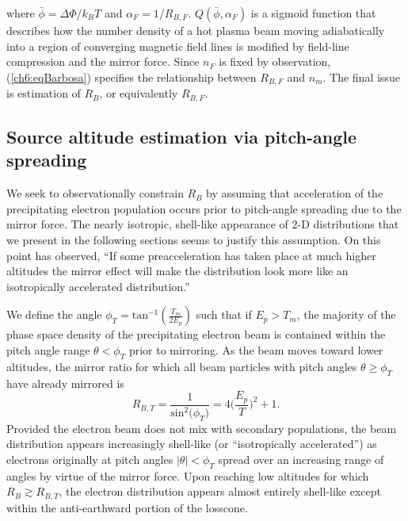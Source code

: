   where $\bar{\phi} = \Delta \Phi / k_B T $ and $\alpha_F = 1 / R_{B,F}$.
  $Q (\bar{\phi}, \alpha_F)$ is a sigmoid function \citep[Figure
  1b][]{Barbosa1977} that describes how the number density of a hot plasma beam
  moving adiabatically into a region of converging magnetic field lines is
  modified by field-line compression and the mirror force. Since $n_F$ is fixed
  by observation, (\ref{ch6:eqBarbosa}) specifies the relationship between
  $R_{B,F}$ and $n_m$. The final issue is estimation of $R_B$, or equivalently
  $R_{B,F}$.

  \subsection{Source altitude estimation via pitch-angle spreading} \label{ssSourceAlt}

  We seek to observationally constrain $R_B$ by assuming that acceleration of
  the precipitating electron population occurs prior to pitch-angle spreading
  due to the mirror force. The nearly isotropic, shell-like appearance of 2-D
  distributions that we present in the following sections seems to justify this
  assumption. On this point \citet{Bostrom2003a} has observed, ``If some
  preacceleration has taken place at much higher altitudes the mirror effect
  will make the distribution look more like an isotropically accelerated
  distribution.''

  We define the angle $\phi_T = \textrm{tan}^{-1} ( \frac{T_m}{2 E_p} )$ such
  that if $E_p > T_m$, the majority of the phase space density of the
  precipitating electron beam is contained within the pitch angle range
  $ \theta < \phi_T$ prior to mirroring. As the beam moves toward lower
  altitudes, the mirror ratio for which all beam particles with pitch angles
  $\theta \geq \phi_T$ have already mirrored is
  \begin{equation} \label{ch6:RBTherm} R_{B,T} = \dfrac{1}{\mathrm{sin}^2 \big
      (\phi_T \big ) } = 4 \Big ( \dfrac{E_p}{T} \Big )^2 + 1.
  \end{equation}
  Provided the electron beam does not mix with secondary populations, the beam
  distribution appears increasingly shell-like (or ``isotropically
  accelerated'') as electrons originally at pitch angles $\vert \theta \vert <
  \phi_T$ spread over an increasing range of angles by virtue of the mirror
  force. Upon reaching low altitudes for which $R_B \gtrsim R_{B,T}$, the
  electron distribution appears almost entirely shell-like except within the
  anti-earthward portion of the losscone.

